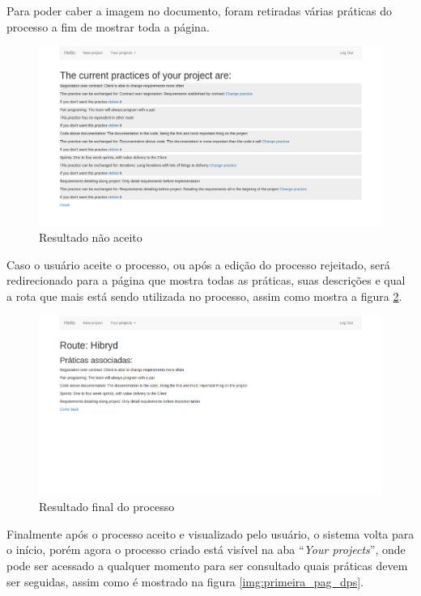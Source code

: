 Para poder caber a imagem no documento, foram retiradas várias práticas do processo a fim de mostrar toda a página.

\begin{figure}[H]
	\centering
	\includegraphics[scale=0.3]{imgFerramenta/edicaoQuestionario}
	\caption{Resultado não aceito}
	\label{img:questio_nao_aceito}
\end{figure}

Caso o usuário aceite o processo, ou após a edição do processo rejeitado, será redirecionado para a página que mostra todas as práticas, suas descrições e qual a rota que mais está sendo utilizada no processo, assim como mostra a figura \ref{img:resultado_processo}.

\begin{figure}[H]
	\centering
	\includegraphics[scale=0.3]{imgFerramenta/resultado}
	\caption{Resultado final do processo}
	\label{img:resultado_processo}
\end{figure}

Finalmente após o processo aceito e visualizado pelo usuário, o sistema volta para o início, porém agora o processo criado está visível na aba ``\textit{Your projects}'', onde pode ser acessado a qualquer momento para ser consultado quais práticas devem ser seguidas, assim como é mostrado na figura \ref{img:primeira_pag_dps}.


